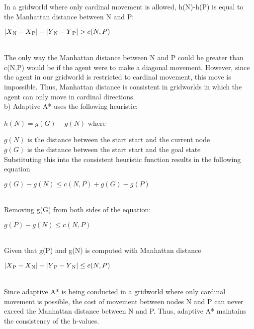 \documentclass[11pt]{article}
\begin{document}
    In a gridworld where only cardinal movement is allowed, h(N)-h(P) is equal to the Manhattan distance between N and P:\\
    \centerline{$|X\textsubscript{N}-X\textsubscript{P}| + |Y\textsubscript{N}-Y\textsubscript{P}| > c(N, P)$}\\
    
    The only way the Manhattan distance between N and P could be greater than c(N,P) would be if the agent were to make a diagonal movement. However, since the agent in our gridworld is restricted to cardinal movement, this move is impossible. Thus, Manhattan distance is consistent in gridworlds in which the agent can only move in cardinal directions.\\

    b) Adaptive A* uses the following heuristic:\\
    \centerline{$h(N) = g(G) - g(N)$ where}
    $g(N)$ is the distance between the start start and the current node\\
    $g(G)$ is the distance between the start start and the goal state\\
    
    Substituting this into the consistent heuristic function results in the following equation\\
    \centerline{$g(G) - g(N) \le c(N,P) + g(G) - g(P)$}\\
    
    Removing g(G) from both sides of the equation:\\
    \centerline{$g(P) - g(N) \le c(N,P)$}\\
    
    Given that g(P) and g(N) is computed with Manhattan distance\\
    \centerline{$|X\textsubscript{P}-X\textsubscript{N}| + |Y\textsubscript{P}-Y\textsubscript{N}| \le c(N, P)$}\\
    
    Since adaptive A* is being conducted in a gridworld where only cardinal movement is possible, the cost of movement between nodes N and P can never exceed the Manhattan distance between N and P. Thus, adaptive A* maintains the consistency of the h-values.
    
\end{document}
